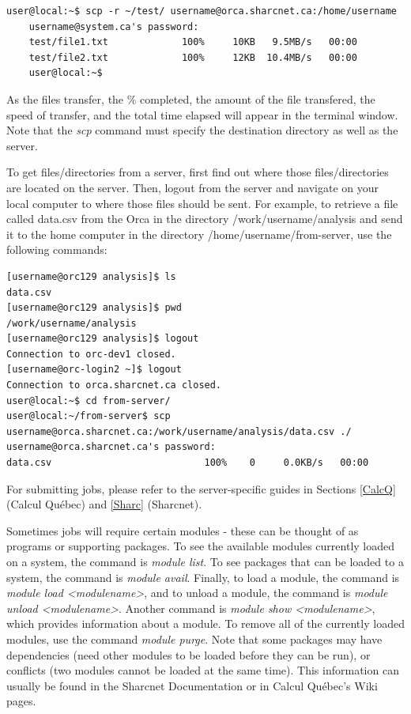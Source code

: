 \documentclass[12pt]{article}
\begin{document}
\begin{lstlisting}[numbers=none]
	user@local:~$ scp -r ~/test/ username@orca.sharcnet.ca:/home/username
	username@system.ca's password:
	test/file1.txt             100% 	10KB   9.5MB/s   00:00 	
	test/file2.txt             100% 	12KB  10.4MB/s   00:00	
	user@local:~$ 
\end{lstlisting}
As the files transfer, the \% completed, the amount of the file transfered, the speed of transfer, and the total time elapsed will appear in the terminal window. Note that the \textit{scp} command must specify the destination directory as well as the server.

\quad To get files/directories from a server, first find out where those files/directories are located on the server. Then, logout from the server and navigate on your local computer to where those files should be sent. For example, to retrieve a file called data.csv from the Orca in the directory /work/username/analysis and send it to the home computer in the directory /home/username/from-server, use the following commands:

\begin{lstlisting}[numbers=none]
[username@orc129 analysis]$ ls
data.csv
[username@orc129 analysis]$ pwd
/work/username/analysis
[username@orc129 analysis]$ logout
Connection to orc-dev1 closed.
[username@orc-login2 ~]$ logout
Connection to orca.sharcnet.ca closed.
user@local:~$ cd from-server/
user@local:~/from-server$ scp username@orca.sharcnet.ca:/work/username/analysis/data.csv ./
username@orca.sharcnet.ca's password: 
data.csv                           100%    0     0.0KB/s   00:00  
\end{lstlisting}
\quad\enskip\quad For submitting jobs, please refer to the server-specific guides in Sections \ref{CalcQ} (Calcul Qu\'{e}bec) and \ref{Sharc} (Sharcnet).

\quad Sometimes jobs will require certain modules - these can be thought of as programs or supporting packages. To see the available modules currently loaded on a system, the command is \textit{module list}. To see packages that can be loaded to a system, the command is \textit{module avail}. Finally, to load a module, the command is \textit{module load <modulename>}, and to unload a module, the command is \textit{module unload <modulename>}. Another command is \textit{module show <modulename>}, which provides information about a module. To remove all of the currently loaded modules, use the command \textit{module purge}. Note that some packages may have dependencies (need other modules to be loaded before they can be run), or conflicts (two modules cannot be loaded at the same time). This information can usually be found in the Sharcnet Documentation or in Calcul Qu\'{e}bec's Wiki pages. 
\end{document}
